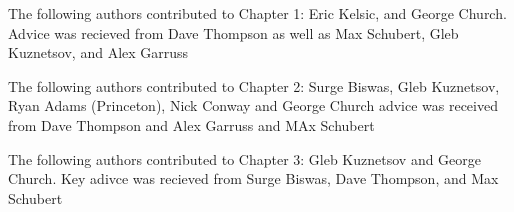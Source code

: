 \noindent The following authors contributed to Chapter 1: Eric Kelsic, and George Church. Advice was recieved from Dave Thompson as well as Max Schubert, Gleb Kuznetsov, and Alex Garruss

\noindent The following authors contributed to Chapter 2: Surge Biswas, Gleb Kuznetsov, Ryan Adams (Princeton), Nick Conway and George Church advice was received from Dave Thompson and Alex Garruss and MAx Schubert 

\noindent The following authors contributed to Chapter 3: Gleb Kuznetsov and George Church. Key adivce was recieved from Surge Biswas, Dave Thompson, and Max Schubert